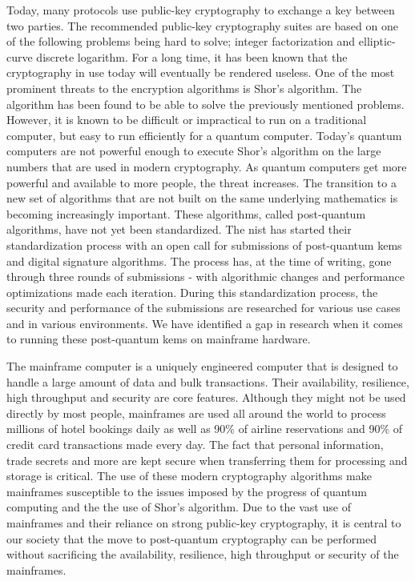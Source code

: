 Today, many protocols use public-key cryptography to exchange a key between two parties. The recommended public-key cryptography suites are based on one of the following problems being hard to solve; integer factorization and elliptic-curve discrete logarithm\cite{nsa2015, nist2019}. For a long time, it has been known that the cryptography in use today will eventually be rendered useless. One of the most prominent threats to the encryption algorithms is Shor's algorithm\cite{shor1997}. The algorithm has been found to be able to solve the previously mentioned problems. However, it is known to be difficult or impractical to run on a traditional computer, but easy to run efficiently for a quantum computer. Today's quantum computers are not powerful enough to execute Shor's algorithm on the large numbers that are used in modern cryptography. As quantum computers get more powerful and available to more people, the threat increases. The transition to a new set of algorithms that are not built on the same underlying mathematics is becoming increasingly important. These algorithms, called \gls{post-quantum} algorithms, have not yet been standardized. The \acrfull{nist} has started their standardization process with an open call for submissions of \gls{post-quantum} \glspl{kem} and digital signature algorithms. The process has, at the time of writing, gone through three rounds of submissions - with algorithmic changes and performance optimizations made each iteration. During this standardization process, the security and performance of the submissions are researched for various use cases and in various environments. We have identified a gap in research when it comes to running these \gls{post-quantum} \glspl{kem} on mainframe hardware.

The mainframe computer is a uniquely engineered computer that is designed to handle a large amount of data and bulk transactions. Their availability, resilience, high throughput and security are core features. Although they might not be used directly by most people, mainframes are used all around the world to process millions of hotel bookings daily as well as 90\% of airline reservations and 90\% of credit card transactions made every day. The fact that personal information, trade secrets and more are kept secure when transferring them for processing and storage is critical. The use of these modern cryptography algorithms make mainframes susceptible to the issues imposed by the progress of quantum computing and the the use of Shor's algorithm. Due to the vast use of mainframes and their reliance on strong public-key cryptography, it is central to our society that the move to \gls{post-quantum} cryptography can be performed without sacrificing the availability, resilience, high throughput or security of the mainframes.

